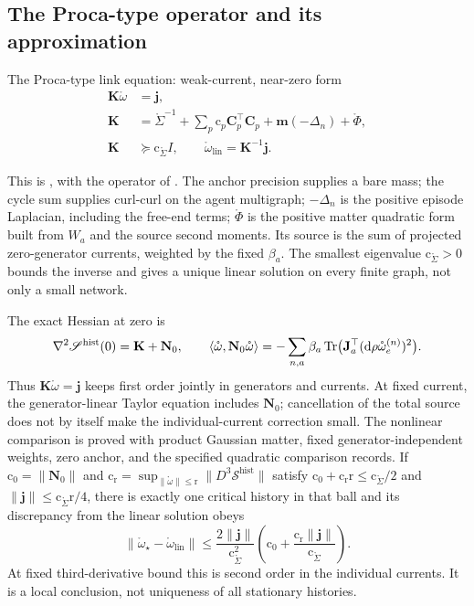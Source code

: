 \subsection{The Proca-type operator and its approximation}

\begin{keyequation}{The Proca-type link equation: weak-current, near-zero form}
\[
\begin{aligned}
\mathbf K\mathring\omega&=\mathbf j,\\
\mathbf K&=\mathring\Sigma^{-1}
+\sum_p\mathrm c_p\mathbf C_p^\top\mathbf C_p
+\mathbf m(-\Delta_n)+\mathring\Phi,\\
\mathbf K&\succeq\mathrm c_{\mathring\Sigma}I,\qquad
\mathring\omega_{\mathrm{lin}}=\mathbf K^{-1}\mathbf j.
\end{aligned}
\]
\end{keyequation}

This is , with the operator of
. The anchor precision supplies a bare mass; the cycle
sum supplies curl-curl on the agent multigraph; $-\Delta_n$ is the positive episode
Laplacian, including the free-end terms; $\mathring\Phi$ is the positive matter quadratic
form built from $W_a$ and the source second moments. Its source is the sum of projected
zero-generator currents, weighted by the fixed $\beta_a$. The smallest eigenvalue
$\mathrm c_{\mathring\Sigma}>0$ bounds the inverse and gives a unique linear solution
on every finite graph, not only a small network.

The exact Hessian at zero is
\[
\nabla^2\mathscr S^{\mathrm{hist}}(0)=\mathbf K+\mathbf N_0,
\qquad
\langle\mathring\omega,\mathbf N_0\mathring\omega\rangle
=-\sum_{n,a}\beta_a\operatorname{Tr}\bigl(\mathbf J_a^\top
(\mathrm d\rho\mathring\omega^{(n)}_e)^2\bigr).
\]
Thus $\mathbf K\mathring\omega=\mathbf j$ keeps first order jointly in generators and
currents. At fixed current, the generator-linear Taylor equation includes $\mathbf N_0$;
cancellation of the total source does not by itself make the individual-current correction
small. The nonlinear comparison is proved with product Gaussian matter, fixed
generator-independent weights, zero anchor, and the specified quadratic comparison records.
If $\mathrm c_0=\lVert\mathbf N_0\rVert$ and
$\mathrm c_{\mathrm r}=\sup_{\lVert\mathring\omega\rVert\leq\mathrm r}
\lVert D^3\mathscr S^{\mathrm{hist}}\rVert$ satisfy
$\mathrm c_0+\mathrm c_{\mathrm r}\mathrm r\leq\mathrm c_{\mathring\Sigma}/2$ and
$\lVert\mathbf j\rVert\leq\mathrm c_{\mathring\Sigma}\mathrm r/4$, there is exactly one
critical history in that ball and its discrepancy from the linear solution obeys
\[
\lVert\mathring\omega_\star-\mathring\omega_{\mathrm{lin}}\rVert
\leq\frac{2\lVert\mathbf j\rVert}{\mathrm c_{\mathring\Sigma}^2}
\left(\mathrm c_0+\frac{\mathrm c_{\mathrm r}\lVert\mathbf j\rVert}
{\mathrm c_{\mathring\Sigma}}\right).
\]
At fixed third-derivative bound this is second order in the individual currents. It is
a local conclusion, not uniqueness of all stationary histories.

